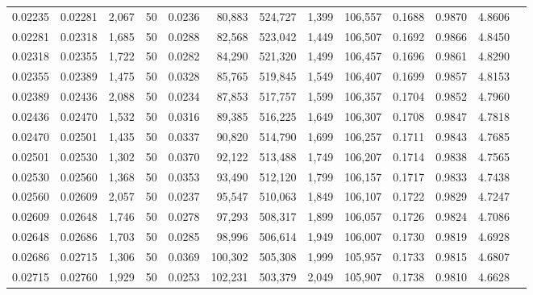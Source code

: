 \begin{tabular}{rrrrrrrrrrrrr}
0.02235 & 0.02281 & 2,067 &  50 &                                     0.0236 &  80,883 & 524,727 &   1,399 & 106,557 & 0.1688 & 0.9870 & 4.8606 \\
0.02281 & 0.02318 & 1,685 &  50 &                                     0.0288 &  82,568 & 523,042 &   1,449 & 106,507 & 0.1692 & 0.9866 & 4.8450 \\
0.02318 & 0.02355 & 1,722 &  50 &                                     0.0282 &  84,290 & 521,320 &   1,499 & 106,457 & 0.1696 & 0.9861 & 4.8290 \\
0.02355 & 0.02389 & 1,475 &  50 &                                     0.0328 &  85,765 & 519,845 &   1,549 & 106,407 & 0.1699 & 0.9857 & 4.8153 \\
0.02389 & 0.02436 & 2,088 &  50 &                                     0.0234 &  87,853 & 517,757 &   1,599 & 106,357 & 0.1704 & 0.9852 & 4.7960 \\
0.02436 & 0.02470 & 1,532 &  50 &                                     0.0316 &  89,385 & 516,225 &   1,649 & 106,307 & 0.1708 & 0.9847 & 4.7818 \\
0.02470 & 0.02501 & 1,435 &  50 &                                     0.0337 &  90,820 & 514,790 &   1,699 & 106,257 & 0.1711 & 0.9843 & 4.7685 \\
0.02501 & 0.02530 & 1,302 &  50 &                                     0.0370 &  92,122 & 513,488 &   1,749 & 106,207 & 0.1714 & 0.9838 & 4.7565 \\
0.02530 & 0.02560 & 1,368 &  50 &                                     0.0353 &  93,490 & 512,120 &   1,799 & 106,157 & 0.1717 & 0.9833 & 4.7438 \\
0.02560 & 0.02609 & 2,057 &  50 &                                     0.0237 &  95,547 & 510,063 &   1,849 & 106,107 & 0.1722 & 0.9829 & 4.7247 \\
0.02609 & 0.02648 & 1,746 &  50 &                                     0.0278 &  97,293 & 508,317 &   1,899 & 106,057 & 0.1726 & 0.9824 & 4.7086 \\
0.02648 & 0.02686 & 1,703 &  50 &                                     0.0285 &  98,996 & 506,614 &   1,949 & 106,007 & 0.1730 & 0.9819 & 4.6928 \\
0.02686 & 0.02715 & 1,306 &  50 &                                     0.0369 & 100,302 & 505,308 &   1,999 & 105,957 & 0.1733 & 0.9815 & 4.6807 \\
0.02715 & 0.02760 & 1,929 &  50 &                                     0.0253 & 102,231 & 503,379 &   2,049 & 105,907 & 0.1738 & 0.9810 & 4.6628 \\

\end{tabular}
